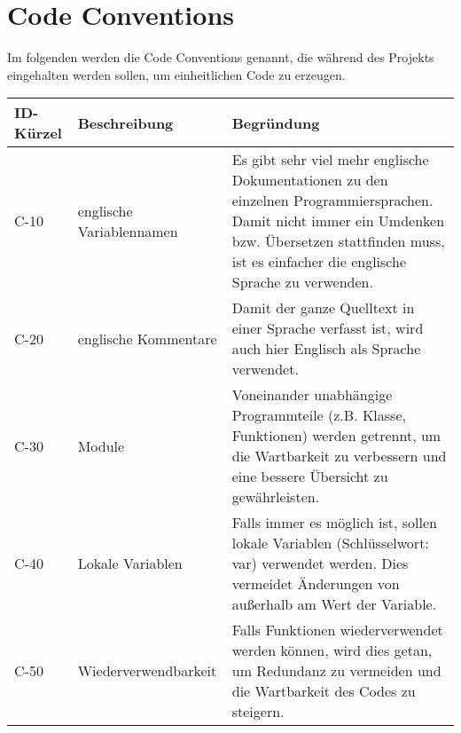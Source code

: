 

\chapter{Code Conventions}
Im folgenden werden die Code Conventions genannt, die während des Projekts eingehalten werden sollen, um einheitlichen Code zu erzeugen.


\begin{tabularx}{\textwidth}{|l|X|X|}
    \toprule
    \textbf{ID-Kürzel} & \textbf{Beschreibung} & \textbf{Begründung}\\
    \midrule
    \endhead
    \hline
    \caption{Code Conventions}
    
    \endfoot
    C-10 & englische Variablennamen &  Es gibt sehr viel mehr englische Dokumentationen zu den einzelnen Programmiersprachen. Damit nicht immer ein Umdenken bzw. Übersetzen stattfinden muss, ist es einfacher die englische Sprache zu verwenden.\\
    C-20 & englische Kommentare & Damit der ganze Quelltext in einer Sprache verfasst ist, wird auch hier Englisch als Sprache verwendet.  \\
    C-30 & Module & Voneinander unabhängige Programmteile (z.B. Klasse, Funktionen) werden getrennt, um die Wartbarkeit zu verbessern und eine bessere Übersicht zu gewährleisten.  \\
    C-40 & Lokale Variablen & Falls immer es möglich ist, sollen lokale Variablen (Schlüsselwort: var) verwendet werden. Dies vermeidet Änderungen von außerhalb am Wert der Variable.\\ 
    C-50 & Wiederverwendbarkeit & Falls Funktionen wiederverwendet werden können, wird dies getan, um Redundanz zu vermeiden und die Wartbarkeit des Codes zu steigern.
  
\end{tabularx}



